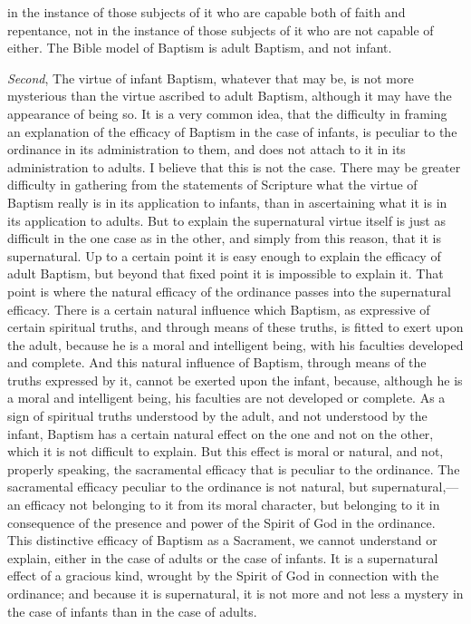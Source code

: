 \documentclass[
  english,
]{book}
\begin{document}
in the instance of those subjects of it who are capable both of faith and repentance, not in the instance of those subjects of it who are not capable of either. The Bible model of Baptism is adult Baptism, and not infant.

\emph{Second}, The virtue of infant Baptism, whatever that may be, is not more mysterious than the virtue ascribed to adult Baptism, although it may have the appearance of being so. It is a very common idea, that the difficulty in framing an explanation of the efficacy of Baptism in the case of infants, is peculiar to the ordinance in its administration to them, and does not attach to it in its administration to adults. I believe that this is not the case. There may be greater difficulty in gathering from the statements of Scripture what the virtue of Baptism really is in its application to infants, than in ascertaining what it is in its application to adults. But to explain the supernatural virtue itself is just as difficult in the one case as in the other, and simply from this reason, that it is supernatural. Up to a certain point it is easy enough to explain the efficacy of adult Baptism, but beyond that fixed point it is impossible to explain it. That point is where the natural efficacy of the ordinance passes into the supernatural efficacy. There is a certain natural influence which Baptism, as expressive of certain spiritual truths, and through means of these truths, is fitted to exert upon the adult, because he is a moral and intelligent being, with his faculties developed and complete. And this natural influence of Baptism, through means of the truths expressed by it, cannot be exerted upon the infant, because, although he is a moral and intelligent being, his faculties are not developed or complete. As a sign of spiritual truths understood by the adult, and not understood by the infant, Baptism has a certain natural effect on the one and not on the other, which it is not difficult to explain. But this effect is moral or natural, and not, properly speaking, the sacramental efficacy that is peculiar to the ordinance. The sacramental efficacy peculiar to the ordinance is not natural, but supernatural,---an efficacy not belonging to it from its moral character, but belonging to it in consequence of the presence and power of the Spirit of God in the ordinance. This distinctive efficacy of Baptism as a Sacrament, we cannot understand or explain, either in the case of adults or the case of infants. It is a supernatural effect of a gracious kind, wrought by the Spirit of God in connection with the ordinance; and because it is supernatural, it is not more and not less a mystery in the case of infants than in the case of adults.
\end{document}
